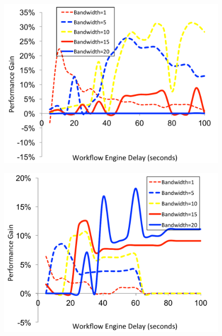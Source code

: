 \documentclass[final]{IEEEtran}
\begin{document}
\begin{figure}[!htb]
\centering
 \includegraphics[width=0.9\linewidth]{figure/UFFS-FFS-Broadband.pdf}
  \label{fig:UFFS-FFS-Broadband}
  \vspace{-10pt}
\end{figure}

\begin{figure}[!htb]
\centering
 \includegraphics[width=0.9\linewidth]{figure/UFFS-FFS-CyberShake.pdf}
  \label{fig:UFFS-FFS-CyberShake}
  \vspace{-10pt}
\end{figure}
\end{document}
